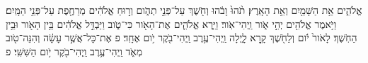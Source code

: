 \documentclass[12pt]{article}
\begin{document}
\begin{hebrew}
\beginnumbering


\pstart
{} 
אֱלֹהִ֑ים אֵ֥ת הַשָּׁמַ֖יִם וְאֵ֥ת הָאָֽרֶץ׃
 תֹ֨הוּ֙ וָבֹ֔הוּ וְחֹ֖שֶׁךְ עַל־פְּנֵ֣י תְהֹ֑ום וְר֣וּחַ אֱלֹהִ֔ים מְרַחֶ֖פֶת עַל־פְּנֵ֥י הַמָּֽיִם׃
וַיֹּ֥אמֶר אֱלֹהִ֖ים יְהִ֣י אֹ֑ור וַֽיְהִי־אֹֽור׃
וַיַּ֧רְא אֱלֹהִ֛ים אֶת־הָאֹ֖ור כִּי־טֹ֑וב וַיַּבְדֵּ֣ל אֱלֹהִ֔ים בֵּ֥ין הָאֹ֖ור וּבֵ֥ין הַחֹֽשֶׁךְ׃
 לָאֹור֙ יֹ֔ום וְלַחֹ֖שֶׁךְ קָ֣רָא לָ֑יְלָה וַֽיְהִי־עֶ֥רֶב וַֽיְהִי־בֹ֖קֶר יֹ֥ום אֶחָֽד׃ פ
 אֶת־כָּל־אֲשֶׁ֣ר עָשָׂ֔ה וְהִנֵּה־טֹ֖וב מְאֹ֑ד וַֽיְהִי־עֶ֥רֶב וַֽיְהִי־בֹ֖קֶר יֹ֥ום הַשִּׁשִּֽׁי׃ פ

\pend
\endnumbering

\end{hebrew}
\end{document}

